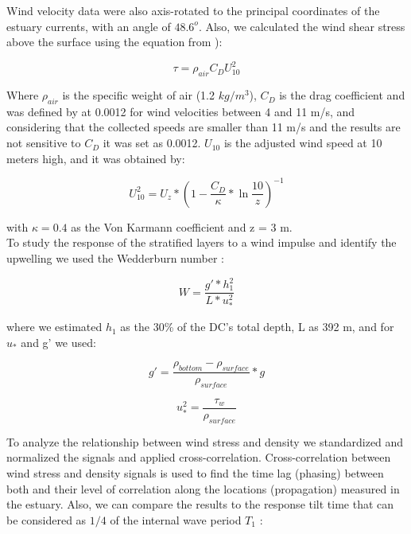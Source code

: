 \documentclass[tesis.tex]{subfiles}
\begin{document}
Wind velocity data were also axis-rotated to the principal coordinates of the estuary currents, with an angle of $48.6^o$. Also, we calculated the wind shear stress above the surface using the equation from \cite{read2011derivation}): 

\begin{equation}
    \tau=\rho_{air} C_D U_{10}^2
    \label{eq: tau}
\end{equation}

Where $\rho_{air}$ is the specific weight of air (1.2 $kg/m^3$), $C_D$ is the drag coefficient and was defined by \cite{large1981open} at 0.0012 for wind velocities between 4 and 11 m/s, and considering that the collected speeds are smaller than 11 m/s and the results are not sensitive to $C_D$ it was set as 0.0012. $U_{10}$ is the adjusted wind speed at 10 meters high, and it was obtained by: 

\begin{equation}
    U_{10}^2=U_z*(1-\frac{C_D}{\kappa}*\ln{\frac{10}{z}})^{-1}
    \label{eq: adjvel}
\end{equation}

with $\kappa=0.4$ as the Von Karmann coefficient and z = 3 m.\\

To study the response of the stratified layers to a wind impulse and identify the upwelling we used the Wedderburn number \citep{Shintani2010}:

\begin{equation}
    W=\frac{g'*h_1^2}{L*u_*^2}
    \label{eq: wed}
\end{equation}

where we estimated $h_1$ as the 30\% of the DC's total depth, L as 392 m, and for $u_*$ and g' we used:

\begin{equation}
    g'=\frac{\rho_{bottom}-\rho_{surface}}{\rho_{surface}}*g
    \label{eq: redg}
\end{equation}

\begin{equation}
    u_*^2=\frac{\tau_w}{\rho_{surface}}
    \label{eq: ustar}
\end{equation}


To analyze the relationship between wind stress and density we standardized and normalized the signals and applied cross-correlation. Cross-correlation between wind stress and density signals is used to find the time lag (phasing) between both and their level of correlation along the locations (propagation) measured in the estuary. Also, we can compare the results to the response tilt time that can be considered as $1/4$ of the internal wave period $T_1$ \citep{stevens1996initial}: 
\end{document}

